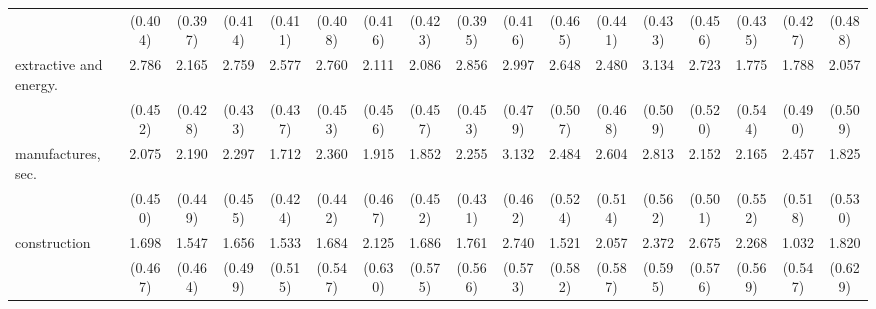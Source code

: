 {\begin{tabular}{l*{16}{c}}
                    &     (0.404)         &     (0.397)         &     (0.414)         &     (0.411)         &     (0.408)         &     (0.416)         &     (0.423)         &     (0.395)         &     (0.416)         &     (0.465)         &     (0.441)         &     (0.433)         &     (0.456)         &     (0.435)         &     (0.427)         &     (0.488)         \\
[1em]
extractive and energy.&       2.786\sym{***}&       2.165\sym{***}&       2.759\sym{***}&       2.577\sym{***}&       2.760\sym{***}&       2.111\sym{***}&       2.086\sym{***}&       2.856\sym{***}&       2.997\sym{***}&       2.648\sym{***}&       2.480\sym{***}&       3.134\sym{***}&       2.723\sym{***}&       1.775\sym{**} &       1.788\sym{***}&       2.057\sym{***}\\
                    &     (0.452)         &     (0.428)         &     (0.433)         &     (0.437)         &     (0.453)         &     (0.456)         &     (0.457)         &     (0.453)         &     (0.479)         &     (0.507)         &     (0.468)         &     (0.509)         &     (0.520)         &     (0.544)         &     (0.490)         &     (0.509)         \\
[1em]
manufactures, sec.  &       2.075\sym{***}&       2.190\sym{***}&       2.297\sym{***}&       1.712\sym{***}&       2.360\sym{***}&       1.915\sym{***}&       1.852\sym{***}&       2.255\sym{***}&       3.132\sym{***}&       2.484\sym{***}&       2.604\sym{***}&       2.813\sym{***}&       2.152\sym{***}&       2.165\sym{***}&       2.457\sym{***}&       1.825\sym{***}\\
                    &     (0.450)         &     (0.449)         &     (0.455)         &     (0.424)         &     (0.442)         &     (0.467)         &     (0.452)         &     (0.431)         &     (0.462)         &     (0.524)         &     (0.514)         &     (0.562)         &     (0.501)         &     (0.552)         &     (0.518)         &     (0.530)         \\
[1em]
construction        &       1.698\sym{***}&       1.547\sym{***}&       1.656\sym{***}&       1.533\sym{**} &       1.684\sym{**} &       2.125\sym{***}&       1.686\sym{**} &       1.761\sym{**} &       2.740\sym{***}&       1.521\sym{**} &       2.057\sym{***}&       2.372\sym{***}&       2.675\sym{***}&       2.268\sym{***}&       1.032         &       1.820\sym{**} \\
                    &     (0.467)         &     (0.464)         &     (0.499)         &     (0.515)         &     (0.547)         &     (0.630)         &     (0.575)         &     (0.566)         &     (0.573)         &     (0.582)         &     (0.587)         &     (0.595)         &     (0.576)         &     (0.569)         &     (0.547)         &     (0.629)         \\

\end{tabular}}
